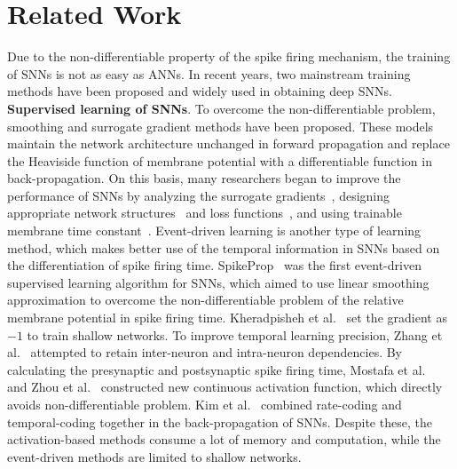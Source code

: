 \documentclass[letterpaper]{article} %
\begin{document}
\section{Related Work}
Due to the non-differentiable property of the spike firing mechanism, the training of SNNs is not as easy as ANNs. %
In recent years, two mainstream training methods have been proposed and widely used in obtaining deep SNNs.\\
\textbf{Supervised learning of SNNs}. To overcome the non-differentiable problem, smoothing and surrogate gradient methods \cite{huh2017gradient,jin2018hybrid,wu2018STBP,shrestha2018slayer,zenke2018superspike,bellec2018long,neftci2019surrogate} have been proposed. These models maintain the network architecture unchanged in forward propagation and replace the Heaviside function of membrane potential with a differentiable function in back-propagation. %
On this basis, many researchers began to improve the performance of SNNs by analyzing the surrogate gradients~\cite{Zenke2020.06.29.176925,li2021differentiable}, designing appropriate network structures~\cite{zheng2021going,fang2020incorporating} and loss functions~\cite{deng2022temporal,guo2022recdis}, and using trainable membrane time constant~\cite{fang2020incorporating}.
Event-driven learning is another type of learning method, which makes better use of the temporal information in SNNs based on the differentiation of spike firing time. SpikeProp~\cite{bohte2002error} was the first event-driven supervised learning algorithm for SNNs, which aimed to use linear smoothing approximation to overcome the non-differentiable problem of the relative membrane potential in spike firing time.  Kheradpisheh et al.~ set the gradient as $-1$ to train shallow networks. To improve temporal learning precision, Zhang et al.~ attempted to retain inter-neuron and intra-neuron dependencies. By calculating the
presynaptic and postsynaptic spike firing time, Mostafa et al.~ and Zhou et al.~  constructed new continuous activation function, which directly avoids non-differentiable problem. Kim et al.~ combined rate-coding and temporal-coding together in the back-propagation of SNNs. Despite these, the activation-based methods consume a lot of memory and computation, while the event-driven methods are limited to shallow networks.\\
\end{document}
